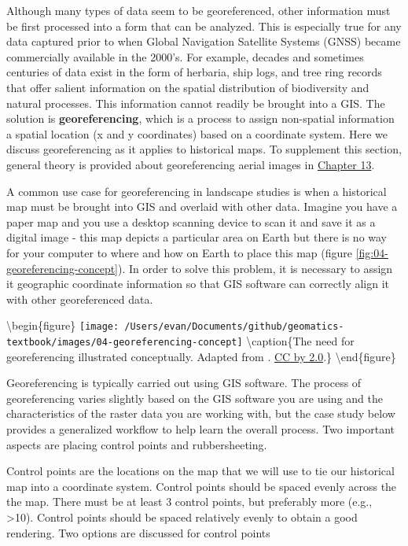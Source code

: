 \documentclass[
]{book}
\begin{document}
Although many types of data seem to be georeferenced, other information must be first processed into a form that can be analyzed. This is especially true for any data captured prior to when Global Navigation Satellite Systems (GNSS) became commercially available in the 2000's. For example, decades and sometimes centuries of data exist in the form of herbaria, ship logs, and tree ring records that offer salient information on the spatial distribution of biodiversity and natural processes. This information cannot readily be brought into a GIS. The solution is \textbf{georeferencing}, which is a process to assign non-spatial information a spatial location (x and y coordinates) based on a coordinate system. Here we discuss georeferencing as it applies to historical maps. To supplement this section, general theory is provided about georeferencing aerial images in \href{https://ubc-geomatics-textbook.github.io/geomatics-textbook/image-processing.html}{Chapter 13}.

A common use case for georeferencing in landscape studies is when a historical map must be brought into GIS and overlaid with other data. Imagine you have a paper map and you use a desktop scanning device to scan it and save it as a digital image - this map depicts a particular area on Earth but there is no way for your computer to where and how on Earth to place this map (figure \ref{fig:04-georeferencing-concept}). In order to solve this problem, it is necessary to assign it geographic coordinate information so that GIS software can correctly align it with other georeferenced data.

\textbackslash begin\{figure\}
\texttt{[image: /Users/evan/Documents/github/geomatics-textbook/images/04-georeferencing-concept]} \textbackslash caption\{The need for georeferencing illustrated conceptually. Adapted from \citet{university_of_texas_libraries_intro_2021}. \href{https://creativecommons.org/licenses/by-nc/2.0/}{CC by 2.0}.\}\label{fig:04-georeferencing-concept}
\textbackslash end\{figure\}

Georeferencing is typically carried out using GIS software. The process of georeferencing varies slightly based on the GIS software you are using and the characteristics of the raster data you are working with, but the case study below provides a generalized workflow to help learn the overall process. Two important aspects are placing control points and rubbersheeting.

Control points are the locations on the map that we will use to tie our historical map into a coordinate system. Control points should be spaced evenly across the the map. There must be at least 3 control points, but preferably more (e.g., \textgreater10). Control points should be spaced relatively evenly to obtain a good rendering. Two options are discussed for control points
\end{document}
